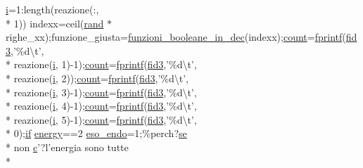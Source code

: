 \begin{DoxyCompactItemize}
\hyperlink{a00065_ad3efca1ea6e3333daf30719ee0501862}{i}=1\-:length(reazione(\-:, \\*
1)) indexx=ceil(\hyperlink{a00064_a078f67f8fbdd9ac6587e03bdf2651d32}{rand} $\ast$righe\-\_\-xx);funzione\-\_\-giusta=\hyperlink{a00065_aca80ac3e93dabd95e623a51f90fb37b6}{funzioni\-\_\-booleane\-\_\-in\-\_\-dec}(indexx);\hyperlink{a00062_aa0a4866d2600caeb20cfacee8eefc922}{count}=\hyperlink{a00062_aa6dc40efe43a338c9ff278260d95b4d9}{fprintf}(\hyperlink{a00062_a153e3250d4161f9bea4c140498016d94}{fid3},'\%d\textbackslash{}t', \\*
reazione(\hyperlink{a00065_ad3efca1ea6e3333daf30719ee0501862}{i}, 1)-\/1);\hyperlink{a00062_aa0a4866d2600caeb20cfacee8eefc922}{count}=\hyperlink{a00062_aa6dc40efe43a338c9ff278260d95b4d9}{fprintf}(\hyperlink{a00062_a153e3250d4161f9bea4c140498016d94}{fid3},'\%d\textbackslash{}t', \\*
reazione(\hyperlink{a00065_ad3efca1ea6e3333daf30719ee0501862}{i}, 2));\hyperlink{a00062_aa0a4866d2600caeb20cfacee8eefc922}{count}=\hyperlink{a00062_aa6dc40efe43a338c9ff278260d95b4d9}{fprintf}(\hyperlink{a00062_a153e3250d4161f9bea4c140498016d94}{fid3},'\%d\textbackslash{}t', \\*
reazione(\hyperlink{a00065_ad3efca1ea6e3333daf30719ee0501862}{i}, 3)-\/1);\hyperlink{a00062_aa0a4866d2600caeb20cfacee8eefc922}{count}=\hyperlink{a00062_aa6dc40efe43a338c9ff278260d95b4d9}{fprintf}(\hyperlink{a00062_a153e3250d4161f9bea4c140498016d94}{fid3},'\%d\textbackslash{}t', \\*
reazione(\hyperlink{a00065_ad3efca1ea6e3333daf30719ee0501862}{i}, 4)-\/1);\hyperlink{a00062_aa0a4866d2600caeb20cfacee8eefc922}{count}=\hyperlink{a00062_aa6dc40efe43a338c9ff278260d95b4d9}{fprintf}(\hyperlink{a00062_a153e3250d4161f9bea4c140498016d94}{fid3},'\%d\textbackslash{}t', \\*
reazione(\hyperlink{a00065_ad3efca1ea6e3333daf30719ee0501862}{i}, 5)-\/1);\hyperlink{a00062_aa0a4866d2600caeb20cfacee8eefc922}{count}=\hyperlink{a00062_aa6dc40efe43a338c9ff278260d95b4d9}{fprintf}(\hyperlink{a00062_a153e3250d4161f9bea4c140498016d94}{fid3},'\%d\textbackslash{}t', \\*
0);\hyperlink{a00024_a01d55766b8058903dd360b4bda71f9f5}{if} \hyperlink{a00065_ac002779c383d2cc783e881f94449de66}{energy}==2 \hyperlink{a00062_aad3b1a68f41f4a6fa247c1cf8e1d450a}{eso\-\_\-endo}=1;\%perch?\hyperlink{a00065_a99032f27eaf45da350b544c68aa6467c}{se} \\*
non \hyperlink{a00029_a6be92348ba85ef257b11d06209e1d7b6}{c}'?l'energia sono tutte \\*

\end{DoxyCompactItemize}
